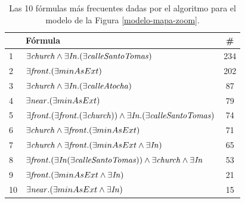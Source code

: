 \begin{table}[H]
\begin{center}
\begin{tabular}{|l|l|c|}
\hline
&F\'ormula			      &  \# \\ \hline \hline

1 & $\exists \mathit{church} \land \exists \mathit{In} .(\exists \mathit{calleSantoTomas}) $&234 \\ \hline

2 & $\exists \mathit{front} . (\exists minAsExt)$&202 \\ \hline

3& $\exists \mathit{church} \land \exists \mathit{In} .(\exists \mathit{calleAtocha})$&87 \\ \hline

4& $\exists \mathit{near} .(\exists minAsExt)$&79 \\ \hline

5& $\exists \mathit{front} .(\exists \mathit{front} .(\exists \mathit{church})) \land \exists \mathit{In} .(\exists \mathit{calleSantoTomas})$&74 \\ \hline

6& $\exists \mathit{church} \land \exists \mathit{front} .(\exists minAsExt)$&71 \\ \hline

7& $\exists \mathit{church} \land \exists \mathit{front} .(\exists minAsExt \land \exists \mathit{In})$&65 \\ \hline

8& $\exists \mathit{front} .(\exists \mathit{In} (\exists \mathit{calleSantoTomas})) \land \exists \mathit{church} \land \exists \mathit{In}$&53 \\ \hline

9& $\exists \mathit{front} .(\exists minAsExt \land \exists \mathit{In} )$&21 \\ \hline

10&$\exists \mathit{near} .(\exists minAsExt \land \exists \mathit{In} )$&15 \\

\hline
\end{tabular}

\caption{Las 10 f\'ormulas m\'as frecuentes dadas por el algoritmo para el modelo de la Figura \protect\ref{modelo-mapa-zoom}.}\label{formulas-mapa-zoom}
\end{center}
\end{table}

